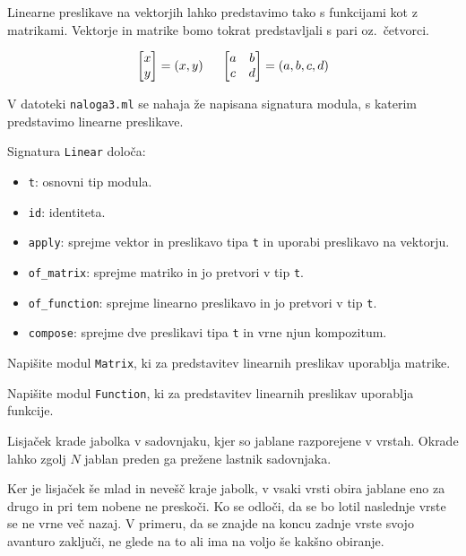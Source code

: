 \documentclass[arhiv]{../izpit}
\begin{document}
\naloga[]
Linearne preslikave na vektorjih lahko predstavimo tako s funkcijami kot z
matrikami.
Vektorje in matrike bomo tokrat predstavljali s pari oz.\ četvorci.

\[
\begin{bmatrix}
    x\\
    y
\end{bmatrix}
=
(x, y)
\hspace{5mm}
\begin{bmatrix}
    a & b \\
    c & d
\end{bmatrix}
=
(a, b, c, d)
\]

V datoteki \texttt{naloga3.ml} se nahaja že napisana signatura modula,
s katerim predstavimo linearne preslikave.

Signatura \texttt{Linear} določa:
\begin{itemize}
\item \texttt{t}: osnovni tip modula.
\item \texttt{id}: identiteta.
\item \texttt{apply}: sprejme vektor in preslikavo tipa \texttt{t} in uporabi preslikavo na vektorju.
\item \texttt{of\_matrix}: sprejme matriko in jo pretvori v tip \texttt{t}.
\item \texttt{of\_function}: sprejme linearno preslikavo in jo pretvori v tip \texttt{t}.
\item \texttt{compose}: sprejme dve preslikavi tipa \texttt{t} in vrne njun kompozitum.
\end{itemize}

\podnaloga
  Napišite modul \texttt{Matrix}, ki za predstavitev linearnih preslikav
  uporablja matrike.

\podnaloga
  Napišite modul \texttt{Function}, ki za predstavitev linearnih preslikav
  uporablja funkcije.

\naloga[]

Lisjaček krade jabolka v sadovnjaku, kjer so jablane razporejene v vrstah.
Okrade lahko zgolj $N$ jablan preden ga prežene lastnik sadovnjaka.

Ker je lisjaček še mlad in nevešč kraje jabolk, v vsaki vrsti obira
jablane eno za drugo in pri tem nobene ne preskoči. Ko se odloči, da se bo
lotil naslednje vrste se ne vrne več nazaj. V primeru, da se znajde na koncu
zadnje vrste svojo avanturo zaključi, ne glede na to ali ima na voljo še kakšno
obiranje.
\end{document}
